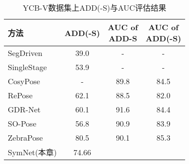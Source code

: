 \begin{table}
  \centering
  \caption{YCB-V数据集上ADD(-S)与AUC评估结果}
  \begin{tabular}{@{}l|c|c|c@{}}
    \toprule
     方法 & ADD(-S) & \makecell{AUC of\\ADD-S} & \makecell{AUC of\\ADD(-S)} \\
    \midrule
    SegDriven\cite{2019segmentation} & 39.0 &  - &  -  \\
    SingleStage\cite{hu2020single} & 53.9 &  - &  - \\
    CosyPose~\cite{labbe2020cosypose} & - &  89.8 &  84.5 \\
    RePose~\cite{iwase2021repose} & 62.1 &  88.5 &  82.0 \\
    GDR-Net~\cite{wang2021gdr} & 60.1 & 91.6 &  84.4 \\
    SO-Pose~\cite{di2021so} & 56.8 &  90.9 &  83.9 \\
    ZebraPose~\cite{su2022zebrapose} & 80.5 &  90.1 & 85.3  \\
    SymNet(本章) & 74.66 & 
    \bottomrule
  \end{tabular}
  \label{tab:ycbv_results_table}
\end{table}